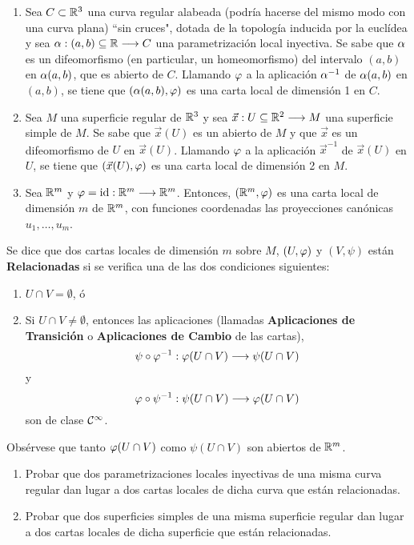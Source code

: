 \documentclass[cursovd_portada.tex]{subfiles}
\begin{document}
\begin{ej}
{\rm
\begin{enumerate}
\item Sea $C\subset\mathbb{R}^3$ una curva regular alabeada (podría
hacerse del mismo modo con una curva plana) ``sin cruces", dotada
de la topología inducida por la euclídea y sea
$\alpha:(a,b)\subseteq\mathbb{R}\longrightarrow C$ una parametrización local
inyectiva. Se sabe que $\alpha$ es un difeomorfismo (en particular, un
homeo\-mor\-fis\-mo) del intervalo $(a,b)$ en $\alpha(a,b)$, que es
abierto de $C$. Llamando $\varphi$ a la aplicación $\alpha^{-1}$ de
$\alpha(a,b)$ en $(a,b)$, se tiene que $(\alpha(a,b),\varphi)$ es una carta
local de dimensión 1 en $C$. \item Sea $M$ una superficie
regular de $\mathbb{R}^3$ y sea $\vec{x}:U\subseteq\mathbb{R}^2\longrightarrow M$ una
superficie simple de $M$. Se sabe que $\vec{x}(U)$ es un abierto
de $M$ y que $\vec{x}$ es un difeomorfismo de $U$ en $\vec{x}(U)$.
Llamando $\varphi$ a la aplicación $\vec{x}^{-1}$ de $\vec{x}(U)$
en $U$, se tiene que $(\vec{x}(U),\varphi)$ es una carta local de
dimensión 2 en $M$. \item Sea $\mathbb{R}^m$ y $\varphi={\rm
id}:\mathbb{R}^m\longrightarrow\mathbb{R}^m$. Entonces, $(\mathbb{R}^m,\varphi)$ es una carta local de
dimensión $m$ de $\mathbb{R}^m$, con funciones coordenadas las
proyecciones canónicas $u_1,\dots ,u_m$.
\end{enumerate}}
\end{ej}
\begin{defi} Se dice que dos cartas locales de dimensión $m$ sobre $M$, $(U,\varphi)$ y $(V,\psi)$ están {\bf
Relacionadas} si se verifica una de las dos condiciones siguientes:
\begin{enumerate}
\item $U\cap V=\emptyset$, ó
\item Si $U\cap V\neq\emptyset$, entonces las aplicaciones (llamadas {\bf Aplicaciones de Transición} o {\bf Aplicaciones
de Cambio} de las cartas),
$$\psi\circ\varphi^{-1}:\varphi(U\cap V)\longrightarrow\psi(U\cap V)$$
y
$$\varphi\circ\psi^{-1}:\psi(U\cap V)\longrightarrow\varphi(U\cap V)$$
son de clase ${\cal C}^{\infty}$.
\end{enumerate}
\hs Obsérvese que tanto $\varphi(U\cap V)$ como $\psi(U\cap V)$ son abiertos de $\mathbb{R}^m$.
\end{defi}
\begin{ej}
{\rm
\begin{enumerate}
\item Probar que dos parametrizaciones locales inyectivas de una
misma curva regular dan lugar a dos cartas locales de dicha curva
que están relacionadas. \item Probar que dos superficies
simples de una misma superficie regular dan lugar a dos cartas
locales de dicha superficie que están relacionadas.
\end{enumerate}}
\end{ej}
\end{document}
